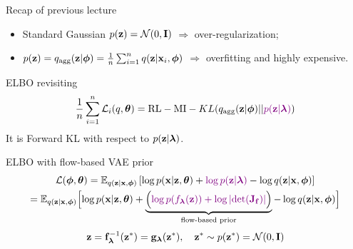 

\begin{frame}
\titlepage
\end{frame}
\begin{frame}{Recap of previous lecture}
	\begin{itemize}
		\item Standard Gaussian $p(\mathbf{z}) = \mathcal{N}(0, \mathbf{I})$ $\Rightarrow$ over-regularization;
		\item $p(\mathbf{z}) = q_{\text{agg}}(\mathbf{z} | \boldsymbol{\phi}) = \frac{1}{n}\sum_{i=1}^n q(\mathbf{z} | \mathbf{x}_i, \boldsymbol{\phi})$ $\Rightarrow$ overfitting and highly expensive.
	\end{itemize}
	\begin{block}{ELBO revisiting}
		\vspace{-0.4cm}
		\[
		\frac{1}{n}\sum_{i=1}^n \mathcal{L}_i(q, \boldsymbol{\theta}) = \text{RL} - \text{MI} -  KL(q_{\text{agg}}(\mathbf{z} | \boldsymbol{\phi}) || {\color{violet}p(\mathbf{z} | \boldsymbol{\lambda})})
		\]
		It is Forward KL with respect to $p(\mathbf{z} | \boldsymbol{\lambda})$.
	\end{block}
	\begin{block}{ELBO with flow-based VAE prior}
		\vspace{-0.6cm}
		{\small
			\begin{multline*}
				\mathcal{L}(\boldsymbol{\phi}, \boldsymbol{\theta}) = \mathbb{E}_{q(\mathbf{z} | \mathbf{x}, \boldsymbol{\phi})} \left[ \log p(\mathbf{x} | \mathbf{z}, \boldsymbol{\theta}) + {\color{violet}\log p(\mathbf{z} | \boldsymbol{\lambda})} - \log q(\mathbf{z} | \mathbf{x}, \boldsymbol{\phi}) \right] \\
				= \mathbb{E}_{q(\mathbf{z} | \mathbf{x}, \boldsymbol{\phi})} \Bigl[ \log p(\mathbf{x} | \mathbf{z}, \boldsymbol{\theta}) + \underbrace{ \Bigl({\color{violet} \log p(f_{\boldsymbol{\lambda}}(\mathbf{z})) + \log \left| \det (\mathbf{J}_{\mathbf{f}}) \right|} \Bigr) }_{\text{flow-based prior}} - \log q(\mathbf{z} | \mathbf{x}, \boldsymbol{\phi}) \Bigr] 
			\end{multline*}
		}
		\vspace{-0.5cm}
		\[
		\mathbf{z} = \mathbf{f}^{-1}_{\boldsymbol{\lambda}}(\mathbf{z}^*) = \mathbf{g}_{\boldsymbol{\lambda}}(\mathbf{z}^*), \quad \mathbf{z}^* \sim p(\mathbf{z}^*) = \mathcal{N}(0, \mathbf{I})
		\]
	\end{block}
	\vspace{-0.5cm}
\end{frame}
